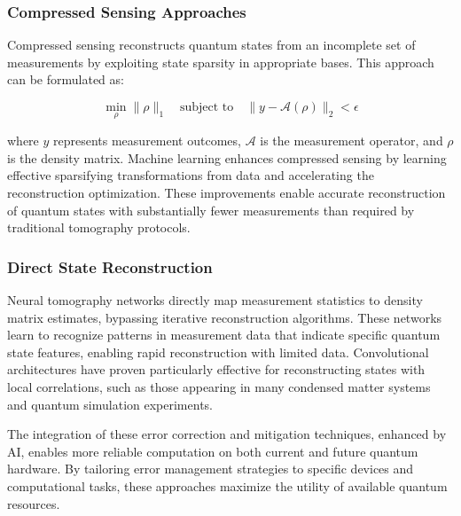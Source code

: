\subsubsection{Compressed Sensing Approaches}

Compressed sensing reconstructs quantum states from an incomplete set of measurements by exploiting state sparsity in appropriate bases. This approach can be formulated as:

\begin{equation}
\min_\rho \|\rho\|_1 \quad \text{subject to} \quad \|y - \mathcal{A}(\rho)\|_2 < \epsilon
\end{equation}

where $y$ represents measurement outcomes, $\mathcal{A}$ is the measurement operator, and $\rho$ is the density matrix. Machine learning enhances compressed sensing by learning effective sparsifying transformations from data and accelerating the reconstruction optimization. These improvements enable accurate reconstruction of quantum states with substantially fewer measurements than required by traditional tomography protocols.

\subsubsection{Direct State Reconstruction}

Neural tomography networks directly map measurement statistics to density matrix estimates, bypassing iterative reconstruction algorithms. These networks learn to recognize patterns in measurement data that indicate specific quantum state features, enabling rapid reconstruction with limited data. Convolutional architectures have proven particularly effective for reconstructing states with local correlations, such as those appearing in many condensed matter systems and quantum simulation experiments.

The integration of these error correction and mitigation techniques, enhanced by AI, enables more reliable computation on both current and future quantum hardware. By tailoring error management strategies to specific devices and computational tasks, these approaches maximize the utility of available quantum resources. 